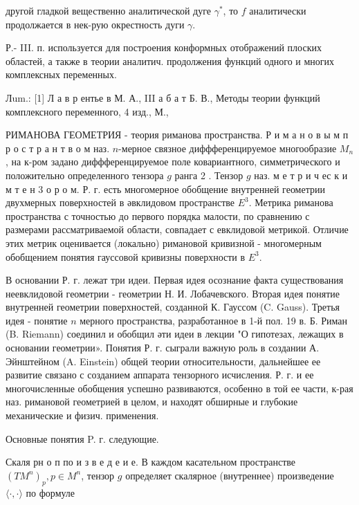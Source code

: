 \documentclass[10pt]{article}
\begin{document}
другой гладкой вещественно аналитической дуге $\gamma^{*}$, то $f$ аналитически продолжается в нек-рую окрестность дуги $\gamma$.



Р.- III. п. используется для построения конформных отображений плоских областей, а также в теории аналитич. продолжения функций одного и многих комплексных переменных.



Лum.: [1] Л а в р ентье в М. А., III а б а т Б. В., Методы теории функций комплексного переменного, 4 изд., М.,



РИМАНОВА ГЕОМЕТРИЯ - теория риманова пространства. Р и м а н о в ы м п р о с т р а н т в о м наз. $n$-мерное связное диффференцируемое многообразие $M_{n}$, на к-ром задано диффференцируемое поле ковариантного, симметрического и положительно определенного тензора $g$ ранга 2 . Тензор $g$ наз. м е т р и ч ес к и м т е н 3 о р о м. Р. г. есть многомерное обобщение внутренней геометрии двухмерных поверхностей в әвклидовом пространстве $E^{3}$. Метрика риманова пространства с точностью до первого порядка малости, по сравнению с размерами рассматриваемой области, совпадает с евклидовой метрикой. Отличие этих метрик оценивается (локально) римановой кривизной - многомерным обобщением понятия гауссовой кривизны поверхности в $E^{3}$.



В основании Р. г. лежат три идеи. Первая идея осознание факта существования неевклидовой геометрии - геометрии Н. И. Лобачевского. Вторая идея понятие внутренней геометрии поверхностей, созданной К. Гауссом (C. Gauss). Третья идея - понятие $n$ мерного пространства, разработанное в 1-й пол. 19 в. Б. Риман (B. Riemann) соединил и обобщил әти идеи в лекции "О гипотезах, лежащих в основании геометрии». Понятия Р. г. сыграли важную роль в создании А. Эйнштейном (A. Einstein) общей теории относительности, дальнейшее ее развитие связано с созданием аппарата тензорного исчисления. Р. г. и ее многочисленные обобщения успешно развиваются, особенно в той ее части, к-рая наз. римановой геометрией в целом, и находят обширные и глубокие механические и физич. применения.



Основные понятия P. г. следующие.



Скаля рн о п по и з в е д е и е. В каждом касательном пространстве $\left(T M^{n}\right)_{p}, p \in M^{n}$, тензор $g$ определяет скалярное (внутреннее) произведение $\langle\cdot, \cdot\rangle$ по формуле
\end{document}
